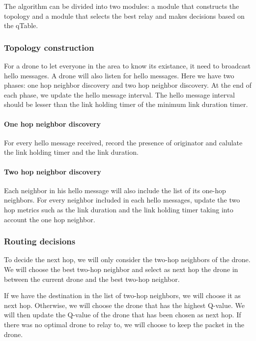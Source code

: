 The algorithm can be divided into two modules: a module that constructs the topology and a module that selects the best relay and makes decisions based on the qTable.

\subsubsection{Topology construction}

For a drone to let everyone in the area to know its existance, it need to broadcast hello messages.
A drone will also listen for hello messages.
Here we have two phases: one hop neighbor discovery and two hop neighbor discovery.
At the end of each phase, we update the hello message interval.
The hello message interval should be lesser than the link holding timer of the minimum link
duration timer.

\paragraph{One hop neighbor discovery}
For every hello message received, record the presence of originator and
calulate the link holding timer and the link duration.

\paragraph{Two hop neighbor discovery}
Each neighbor in his hello message will also include the list of its one-hop neighbors.
For every neighbor included in each hello messages, update the two hop metrics such as the
link duration and the link holding timer taking into account the one hop neighbor.


\subsubsection{Routing decisions}
To decide the next hop, we will only consider the two-hop neighbors of the drone. %
We will choose the best two-hop neighbor and select as next hop the drone in between
the current drone and the best two-hop neighbor.

If we have the destination in the list of two-hop neighbors, we will choose it as next hop.
Otherwise, we will choose the drone that has the highest Q-value.
We will then update the Q-value of the drone that has been chosen as next hop.
If there was no optimal drone to relay to, we will choose to keep the packet in the drone.




